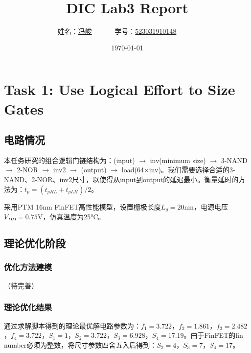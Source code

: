\documentclass[UTF8,12pt,a4paper]{ctexart}
\title{DIC Lab3 Report}
\author{
	姓名：\underline{冯峻}~~~~~~
	学号：\underline{523031910148}~~~~~~}
\date{\today}
\begin{document}
\fancyfoot[C]{\thepage}

\maketitle



\section{Task 1: Use Logical Effort to Size Gates}

\subsection{电路情况}

本任务研究的组合逻辑门链结构为：(input) $\rightarrow$ inv(minimum size) $\rightarrow$ 3-NAND $\rightarrow$ 2-NOR $\rightarrow$ inv2 $\rightarrow$ (output) $\rightarrow$ load(64$\times$inv)。我们需要选择合适的3-NAND、2-NOR、inv2尺寸，以使得从input到output的延迟最小。衡量延时的方法为：$t_p = (t_{pHL} + t_{pLH})/2$。

采用PTM 16nm FinFET高性能模型，设置栅极长度$L_g = 20$nm，电源电压$V_{DD} = 0.75$V，仿真温度为25°C。

\subsection{理论优化阶段}

\subsubsection{优化方法建模}

（待完善）

\subsubsection{理论优化结果}

通过求解脚本得到的理论最优解电路参数为：$f_1 = 3.722$，$f_2 = 1.861$，$f_3 = 2.482$，$f_4 = 3.722$，$S_1 = 1$，$S_2 = 3.722$，$S_3 = 6.928$，$S_4 = 17.19$。由于FinFET的fin number必须为整数，将尺寸参数四舍五入后得到：$S_2 = 4$，$S_3 = 7$，$S_4 = 17$。
\end{document}
